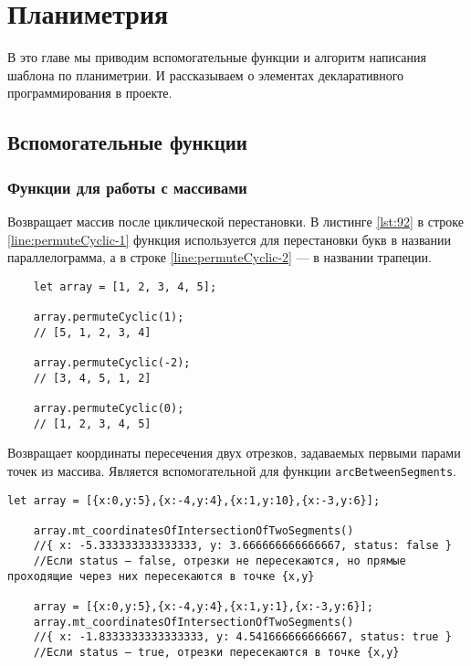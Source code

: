 
\section{Планиметрия}
В это главе мы приводим вспомогательные функции и алгоритм написания шаблона по планиметрии. И рассказываем о элементах декларативного программирования в проекте.
\subsection{Вспомогательные функции}
\subsubsection{Функции для работы с массивами}
Возвращает массив после циклической перестановки.
В листинге \ref{lst:92} в строке \ref{line:permuteCyclic-1} функция используется для перестановки букв в названии параллелограмма, а в строке \ref{line:permuteCyclic-2} — в названии трапеции.

\begin{lstlisting}
    let array = [1, 2, 3, 4, 5];

    array.permuteCyclic(1);
    // [5, 1, 2, 3, 4]

    array.permuteCyclic(-2);
    // [3, 4, 5, 1, 2]

    array.permuteCyclic(0);
    // [1, 2, 3, 4, 5]
    \end{lstlisting}

Возвращает координаты пересечения двух отрезков, задаваемых первыми парами точек из массива. Является вспомогательной для функции \texttt{arcBetweenSegments}.

\begin{lstlisting}[escapechar=|]
    let array = [{x:0,y:5},{x:-4,y:4},{x:1,y:10},{x:-3,y:6}];

    array.mt_coordinatesOfIntersectionOfTwoSegments()
    //{ x: -5.333333333333333, y: 3.666666666666667, status: false }
    //Если status — false, отрезки не пересекаются, но прямые проходящие через них пересекаются в точке {x,y}

    array = [{x:0,y:5},{x:-4,y:4},{x:1,y:1},{x:-3,y:6}];
    array.mt_coordinatesOfIntersectionOfTwoSegments()
    //{ x: -1.8333333333333333, y: 4.541666666666667, status: true }
    //Если status — true, отрезки пересекаются в точке {x,y}
        
\end{lstlisting}

